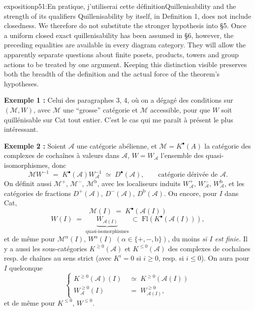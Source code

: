 \begin{dcomment}{exposition}{p51:En pratique, j'utiliserai cette définition}{Quillenisability and the strength of its qualifiers}
Quillenisability by itself, in Definition 1, does not include closedness. We therefore do not substitute the stronger hypothesis into \S5. Once a uniform closed exact quillenisability has been assumed in \S6, however, the preceding equalities are available in every diagram category. They will allow the apparently separate questions about finite posets, products, towers and group actions to be treated by one argument. Keeping this distinction visible preserves both the breadth of the definition and the actual force of the theorem's hypotheses.
\end{dcomment}


\textbf{Exemple 1 :} Celui des paragraphes 3, 4, où on a dégagé des conditions sur $(\mathcal{M},W)$, avec $\mathcal{M}$ une ``grosse'' catégorie et $\mathcal{M}$ accessible, pour que $W$ soit quillénisable sur Cat tout entier. C'est le cas qui me paraît à présent le plus intéressant.

\textbf{Exemple 2 :} Soient $\mathcal{A}$ une catégorie abélienne, et $\mathcal{M} = K^{\bullet}(A)$ la catégorie des complexes de cochaînes à valeurs dans $\mathcal{A}$, $W = W_{\mathcal{A}}$ l'ensemble des quasi-isomorphismes, donc %
\[ \mathcal{M}W^{-1} \;=\; K^{\bullet}(\mathcal{A})W_{\mathcal{A}}^{-1} \;\simeq\; D^{\bullet}(\mathcal{A}), \qquad \text{catégorie dérivée de $\mathcal{A}$.} \]
On définit aussi $\mathcal{M}^{+}$, $\mathcal{M}^{-}$, $\mathcal{M}^{\mathrm{b}}$, avec les localiseurs induits $W_{\mathcal{A}}^{+}$, $W_{\mathcal{A}}^{-}$, $W_{\mathcal{A}}^{\mathrm{b}}$, et les catégories de fractions $D^{+}(\mathcal{A})$, $D^{-}(\mathcal{A})$, $D^{\mathrm{b}}(\mathcal{A})$. Ou
encore, pour $I$ dans Cat,
\[ \mathcal{M}(I) \;=\; K^{\bullet}(\mathcal{A}(I)) \]
\[ W(I) \;=\; \underbrace{W_{\mathcal{A}(I)}}_{\text{quasi-isomorphismes}} \;\subset\; \mathrm{Fl}(K^{\bullet}(\mathcal{A}(I))), \]
et de même pour $\mathcal{M}^{\alpha}(I)$, $W^{\alpha}(I)$ $(\alpha \in \{+,-,\mathrm{b}\})$, du moins \textit{si $I$ est finie.} Il y a aussi les sous-catégories $K^{\geq 0}(\mathcal{A})$ et $K^{\leq 0}(\mathcal{A})$ des complexes de cochaînes resp. de chaînes au sens strict (avec $K^{i} = 0$ si $i \geq 0$, resp. si $i \leq 0$). On aura pour $I$ quelconque
\[ \left\{ \begin{aligned} K^{\geq 0}(\mathcal{A})(I) &\;\simeq\; K^{\geq 0}(\mathcal{A}(I)) \\ W_{\mathcal{A}}^{\geq 0}(I) &\;=\; W_{\mathcal{A}(I)}^{\geq 0}, \end{aligned} \right. \]
et de même pour $K^{\leq 0}$, $W^{\leq 0}$.

